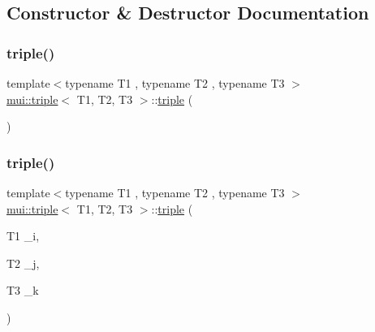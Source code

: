 \subsection{Constructor \& Destructor Documentation}
\mbox{\label{structmui_1_1triple_ac785524bd6bde13bb2cc63c1032807e4}} 
\subsubsection{\texorpdfstring{triple()}{triple()}\hspace{0.1cm}{\footnotesize\ttfamily [1/3]}}
{\footnotesize\ttfamily template$<$typename T1 , typename T2 , typename T3 $>$ \\
\hyperlink{structmui_1_1triple}{mui\+::triple}$<$ T1, T2, T3 $>$\+::\hyperlink{structmui_1_1triple}{triple} (\begin{DoxyParamCaption}{ }\end{DoxyParamCaption})\hspace{0.3cm}{\ttfamily [inline]}}

\mbox{\label{structmui_1_1triple_a8df5fd0ecd47c89de83072bde1a39b14}} 
\subsubsection{\texorpdfstring{triple()}{triple()}\hspace{0.1cm}{\footnotesize\ttfamily [2/3]}}
{\footnotesize\ttfamily template$<$typename T1 , typename T2 , typename T3 $>$ \\
\hyperlink{structmui_1_1triple}{mui\+::triple}$<$ T1, T2, T3 $>$\+::\hyperlink{structmui_1_1triple}{triple} (\begin{DoxyParamCaption}\item[{T1}]{\+\_\+i,  }\item[{T2}]{\+\_\+j,  }\item[{T3}]{\+\_\+k }\end{DoxyParamCaption})\hspace{0.3cm}{\ttfamily [inline]}}

\mbox{\label{structmui_1_1triple_a66865d104e59020489ca142b6b55414c}} 
